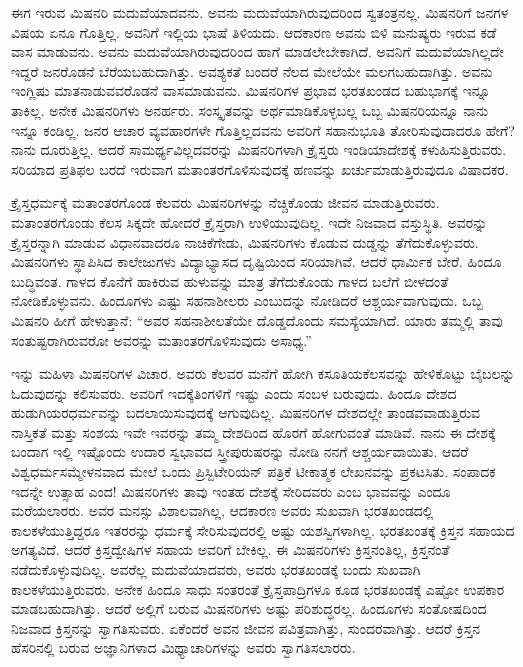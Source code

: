ಈಗ ಇರುವ ಮಿಷನರಿ ಮದುವೆಯಾದವನು. ಅವನು ಮದುವೆಯಾಗಿರುವುದರಿಂದ ಸ್ವತಂತ್ರನಲ್ಲ. ಮಿಷನರಿಗೆ ಜನಗಳ ವಿಷಯ ಏನೂ ಗೊತ್ತಿಲ್ಲ. ಅವನಿಗೆ ಇಲ್ಲಿಯ ಭಾಷೆ ತಿಳಿಯದು. ಆದಕಾರಣ ಅವನು ಬಿಳಿ ಮನುಷ್ಯರು ಇರುವ ಕಡೆ ವಾಸ ಮಾಡುವನು. ಅವನು ಮದುವೆಯಾಗಿರುವುದರಿಂದ ಹಾಗೆ ಮಾಡಲೇಬೇಕಾಗಿದೆ. ಅವನಿಗೆ ಮದುವೆಯಾಗಿಲ್ಲದೇ ಇದ್ದರೆ ಜನರೊಡನೆ ಬೆರೆಯಬಹುದಾಗಿತ್ತು. ಅವಶ್ಯಕತೆ ಬಂದರೆ ನೆಲದ ಮೇಲೆಯೇ ಮಲಗಬಹುದಾಗಿತ್ತು. ಅವನು ಇಂಗ್ಲಿಷು ಮಾತನಾಡುವವರೊಡನೆ ವಾಸಮಾಡುವನು. ಮಿಷನರಿಗಳ ಪ್ರಭಾವ ಭರತಖಂಡದ ಬಹುಭಾಗಕ್ಕೆ ಇನ್ನೂ ತಾಕಿಲ್ಲ. ಅನೇಕ ಮಿಷನರಿಗಳು ಅನರ್ಹರು. ಸಂಸ್ಕೃತವನ್ನು ಅರ್ಥಮಾಡಿಕೊಳ್ಳಬಲ್ಲ ಒಬ್ಬ ಮಿಷನರಿಯನ್ನೂ ನಾನು ಇನ್ನೂ ಕಂಡಿಲ್ಲ. ಜನರ ಆಚಾರ ವ್ಯವಹಾರಗಳೇ ಗೊತ್ತಿಲ್ಲದವನು ಅವರಿಗೆ ಸಹಾನುಭೂತಿ ತೋರಿಸುವುದಾದರೂ ಹೇಗೆ? ನಾನು ದೂರುತ್ತಿಲ್ಲ. ಆದರೆ ಸಾಮರ್ಥ್ಯವಿಲ್ಲದವರನ್ನು ಮಿಷನರಿಗಳಾಗಿ ಕ್ರೈಸ್ತರು ಇಂಡಿಯಾದೇಶಕ್ಕೆ ಕಳುಹಿಸುತ್ತಿರುವರು. ಸರಿಯಾದ ಪ್ರತಿಫಲ ಬರದೆ ಇರುವಾಗ ಮತಾಂತರಗೊಳಿಸುವುದಕ್ಕೆ ಹಣವನ್ನು ಖರ್ಚುಮಾಡುತ್ತಿರುವುದೂ ವಿಷಾದಕರ.

\vskip 4pt

ಕ್ರೈಸ್ತಧರ್ಮಕ್ಕೆ ಮತಾಂತರಗೊಂಡ ಕೆಲವರು ಮಿಷನರಿಗಳನ್ನು ನೆಚ್ಚಿಕೊಂಡು ಜೀವನ ಮಾಡುತ್ತಿರುವರು. ಮತಾಂತರಗೊಂಡು ಕೆಲಸ ಸಿಕ್ಕದೇ ಹೋದರೆ ಕ್ರೈಸ್ತರಾಗಿ ಉಳಿಯುವುದಿಲ್ಲ. ಇದೇ ನಿಜವಾದ ವಸ್ತುಸ್ಥಿತಿ. ಅವರನ್ನು ಕ್ರೈಸ್ತರನ್ನಾಗಿ ಮಾಡುವ ವಿಧಾನವಾದರೂ ನಾಚಿಕೆಗೇಡು, ಮಿಷನರಿಗಳು ಕೊಡುವ ದುಡ್ಡನ್ನು ತೆಗೆದುಕೊಳ್ಳುವರು. ಮಿಷನರಿಗಳು ಸ್ಥಾಪಿಸಿದ ಕಾಲೇಜುಗಳು ವಿದ್ಯಾಭ್ಯಾಸದ ದೃಷ್ಟಿಯಿಂದ ಸರಿಯಾಗಿವೆ. ಆದರೆ ಧಾರ್ಮಿಕ ಬೇರೆ. ಹಿಂದೂ ಬುದ್ಧಿವಂತ. ಗಾಳದ ಕೊನೆಗೆ ಹಾಕಿರುವ ಹುಳುವನ್ನು ಮಾತ್ರ ತೆಗೆದುಕೊಂಡು ಗಾಳದ ಬಲೆಗೆ ಬೀಳದಂತೆ ನೋಡಿಕೊಳ್ಳುವನು. ಹಿಂದೂಗಳು ಎಷ್ಟು ಸಹನಾಶೀಲರು ಎಂಬುದನ್ನು ನೋಡಿದರೆ ಆಶ್ಚರ್ಯವಾಗುವುದು. ಒಬ್ಬ ಮಿಷನರಿ ಹೀಗೆ ಹೇಳುತ್ತಾನೆ: “ಅವರ ಸಹನಾಶೀಲತೆಯೇ ದೊಡ್ಡದೊಂದು ಸಮಸ್ಯೆಯಾಗಿದೆ. ಯಾರು ತಮ್ಮಲ್ಲಿ ತಾವು ಸಂತುಷ್ಟರಾಗಿರುವರೋ ಅವರನ್ನು ಮತಾಂತರಗೊಳಿಸುವುದು ಅಸಾಧ್ಯ.”

\vskip 4pt

ಇನ್ನು ಮಹಿಳಾ ಮಿಷನರಿಗಳ ವಿಚಾರ. ಅವರು ಕೆಲವರ ಮನೆಗೆ ಹೋಗಿ ಕಸೂತಿಯ\break ಕೆಲಸವನ್ನು ಹೇಳಿಕೊಟ್ಟು ಬೈಬಲನ್ನು ಓದುವುದನ್ನು ಕಲಿಸುವರು. ಅವರಿಗೆ ಇದಕ್ಕೆ\break ತಿಂಗಳಿಗೆ ಇಷ್ಟು ಎಂದು ಸಂಬಳ ಬರುವುದು. ಹಿಂದೂ ದೇಶದ ಹುಡುಗಿಯರ\break ಧರ್ಮವನ್ನು ಬದಲಾಯಿಸುವುದಕ್ಕೆ ಆಗುವುದಿಲ್ಲ. ಮಿಷನರಿಗಳ ದೇಶದಲ್ಲೇ ತಾಂಡವವಾಡುತ್ತಿರುವ ನಾಸ್ತಿಕತೆ ಮತ್ತು ಸಂಶಯ ಇವೇ ಇವರನ್ನು ತಮ್ಮ ದೇಶದಿಂದ ಹೊರಗೆ ಹೋಗುವಂತೆ ಮಾಡಿವೆ. ನಾನು ಈ ದೇಶಕ್ಕೆ ಬಂದಾಗ ಇಲ್ಲಿ ಇಷ್ಟೊಂದು ಉದಾರ ಸ್ವಭಾವದ ಸ್ತ್ರೀಪುರುಷರನ್ನು ನೋಡಿ ನನಗೆ ಆಶ್ಚರ್ಯವಾಯಿತು. ಆದರೆ ವಿಶ್ವಧರ್ಮಸಮ್ಮೇಳನವಾದ ಮೇಲೆ ಒಂದು ಪ್ರಿಸ್ಬಿಟೇರಿಯನ್​ ಪತ್ರಿಕೆ ಟೀಕಾತ್ಮಕ ಲೇಖನವನ್ನು ಪ್ರಕಟಸಿತು. ಸಂಪಾದಕ ಇದನ್ನೇ ಉತ್ಸಾಹ ಎಂದ! ಮಿಷನರಿಗಳು ತಾವು ಇಂತಹ ದೇಶಕ್ಕೆ ಸೇರಿದವರು ಎಂಬ ಭಾವವನ್ನು ಎಂದೂ ಮರೆಯಲಾರರು. ಅವರ ಮನಸ್ಸು ವಿಶಾಲವಾಗಿಲ್ಲ, ಆದಕಾರಣ ಅವರು ಸುಖವಾಗಿ ಭರತಖಂಡದಲ್ಲಿ ಕಾಲಕಳೆಯುತ್ತಿದ್ದರೂ ಇತರರನ್ನು ಧರ್ಮಕ್ಕೆ ಸೇರಿಸುವುದರಲ್ಲಿ ಅಷ್ಟು ಯಶಸ್ವಿಗಳಾಗಿಲ್ಲ. ಭರತಖಂತಕ್ಕೆ ಕ್ರಿಸ್ತನ ಸಹಾಯದ ಅಗತ್ಯವಿದೆ. ಆದರೆ ಕ್ರಿಸ್ತದ್ವೇಷಿಗಳ ಸಹಾಯ ಅವರಿಗೆ ಬೇಕಿಲ್ಲ. ಈ ಮಿಷನರಿಗಳು ಕ್ರಿಸ್ತನಂತಿಲ್ಲ, ಕ್ರಿಸ್ತನಂತೆ ನಡೆದುಕೊಳ್ಳುವುದಿಲ್ಲ. ಅವರೆಲ್ಲ ಮದುವೆಯಾದವರು, ಅವರು ಭರತಖಂಡಕ್ಕೆ ಬಂದು ಸುಖವಾಗಿ ಕಾಲಕಳೆಯುತ್ತಿರುವರು. ಅನೇಕ ಹಿಂದೂ ಸಾಧು ಸಂತರಂತೆ ಕ್ರೈಸ್ತಪಾದ್ರಿಗಳೂ ಕೂಡ ಭರತಖಂಡಕ್ಕೆ ಎಷ್ಟೋ ಉಪಕಾರ ಮಾಡಬಹುದಾಗಿತ್ತು. ಆದರೆ ಅಲ್ಲಿಗೆ ಬರುವ ಮಿಷನರಿಗಳು ಅಷ್ಟು ಪರಿಶುದ್ಧರಲ್ಲ. ಹಿಂದೂಗಳು ಸಂತೋಷದಿಂದ ನಿಜವಾದ ಕ್ರಿಸ್ತನನ್ನು ಸ್ವಾಗತಿಸುವರು. ಏಕೆಂದರೆ ಅವನ ಜೀವನ ಪವಿತ್ರವಾಗಿತ್ತು, ಸುಂದರವಾಗಿತ್ತು. ಆದರೆ ಕ್ರಿಸ್ತನ ಹೆಸರಿನಲ್ಲಿ ಬರುವ ಅಜ್ಞಾನಿಗಳಾದ ಮಿಥ್ಯಾಚಾರಿಗಳನ್ನು ಅವರು ಸ್ವಾಗತಿಸಲಾರರು.

